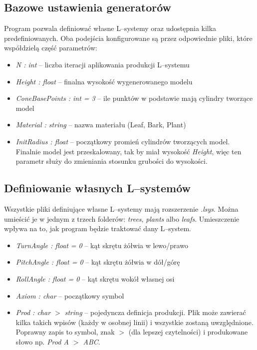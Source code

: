 \documentclass[inz,shortabstract]{iithesis}
\begin{document}
        \subsection{Bazowe ustawienia generatorów}
        Program pozwala definiować własne L--systemy oraz udostępnia kilka predefiniowanych. Oba podejścia konfigurowane są przez odpowiednie pliki, które współdzielą część parametrów:
        
        \begin{itemize}
            \item \textit{N : int} -- liczba iteracji aplikowania produkcji L--systemu 
            \item \textit{Height : float} -- finalna wysokość wygenerowanego modelu
            \item \textit{ConeBasePoints : int = 3} -- ile punktów w podstawie mają cylindry tworzące model
            \item \textit{Material : string} -- nazwa materiału (Leaf, Bark, Plant)
            \item \textit{InitRadius : float} -- początkowy promień cylindrów tworzących model. Finalnie model jest przeskalowany, tak by miał wysokość \textit{Height}, więc ten parametr służy do zmieniania stosunku grubości do wysokości. 
        \end{itemize}
        
        \subsection{Definiowanie własnych L--systemów}
        Wszystkie pliki definiujące własne L--systemy mają rozszerzenie \textit{.lsys}. Można umieścić je w jednym z trzech folderów: \textit{trees}, \textit{plants} albo \textit{leafs}. Umieszczenie wpływa na to, jak program będzie traktować dany L--system.
        
        \begin{itemize}
            \item \textit{TurnAngle : float = 0} -- kąt skrętu żółwia w lewo/prawo
            \item \textit{PitchAngle : float = 0} -- kąt skrętu żółwia w dół/górę 
            \item \textit{RollAngle : float = 0} -- kąt skrętu wokół własnej osi
            \item \textit{Axiom : char} -- początkowy symbol
            \item \textit{Prod : char $>$ string } -- pojedyncza definicja produkcji. Plik może zawierać kilka takich wpisów (każdy w osobnej linii) i wszystkie zostaną uwzględnione. Poprawny zapis to symbol, znak $>$ (dla lepszej czytelności) i produkowane słowo np. \textit{Prod A $>$ ABC}. 
        \end{itemize}
        
\end{document}
